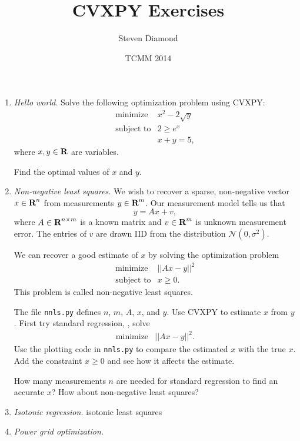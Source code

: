 \documentclass[12pt]{article}
\title{CVXPY Exercises}
\author{Steven Diamond}
\date{TCMM 2014}
\begin{document}
\maketitle

\begin{enumerate}
\item\emph{Hello world.}
Solve the following optimization problem using CVXPY:
\[
\begin{array}{ll} \mbox{minimize} & x^2 - 2\sqrt{y}\\
\mbox{subject to} & 2 \geq e^x \\
& x + y = 5,
\end{array}
\]
where $x,y \in {\mbox{\bf R}}$ are variables.

Find the optimal values of $x$ and $y$.

\item\emph{Non-negative least squares.}
We wish to recover a sparse, non-negative vector $x \in {\mbox{\bf R}}^n$ from measurements $y \in {\mbox{\bf R}}^m$. Our measurement model tells us that
$$
y = Ax + v,
$$
where $A \in {\mbox{\bf R}}^{n \times m}$ is a known matrix and $v \in {\mbox{\bf R}}^m$ is unknown measurement error. The entries of $v$ are drawn IID from the distribution $\mathcal{N}(0, \sigma^2)$.

We can recover a good estimate of $x$ by solving the optimization problem
\[
\begin{array}{ll} \mbox{minimize} & ||Ax - y||^2\\
\mbox{subject to} & x \geq 0.
\end{array}
\]
This problem is called non-negative least squares.

The file \verb+nnls.py+ defines $n$, $m$, $A$, $x$, and $y$. Use CVXPY to estimate $x$ from $y$. First try standard regression, \ie, solve
\[
\begin{array}{ll} \mbox{minimize} & ||Ax - y||^2.
\end{array}
\]
Use the plotting code in \verb+nnls.py+ to compare the estimated $x$ with the true $x$. Add the constraint $x \geq 0$ and see how it affects the estimate.

How many measurements $n$ are needed for standard regression to find an accurate $x$? How about non-negative least squares?

\item\emph{Isotonic regression.}
isotonic least squares

\item\emph{Power grid optimization.}

\end{enumerate}
\end{document}
